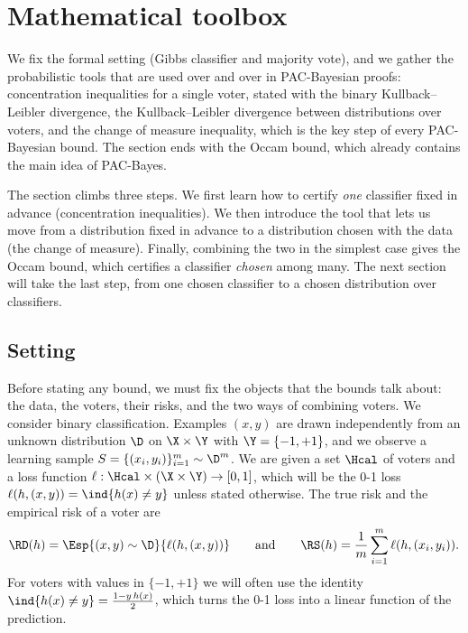 \section{Mathematical toolbox}
\label{chap:tools}

\begin{objectives}
We fix the formal setting (Gibbs classifier and majority vote), and we gather
the probabilistic tools that are used over and over in PAC-Bayesian proofs:
concentration inequalities for a single voter, stated with the binary
Kullback--Leibler divergence, the Kullback--Leibler divergence between
distributions over voters, and the change of measure inequality, which is the
key step of every PAC-Bayesian bound. The section ends with the Occam bound,
which already contains the main idea of PAC-Bayes.
\end{objectives}

The section climbs three steps. We first learn how to certify \emph{one}
classifier fixed in advance (concentration inequalities). We then introduce the
tool that lets us move from a distribution fixed in advance to a distribution
chosen with the data (the change of measure). Finally, combining the two in the
simplest case gives the Occam bound, which certifies a classifier \emph{chosen}
among many. The next section will take the last step, from one chosen
classifier to a chosen distribution over classifiers.

\subsection{Setting}

Before stating any bound, we must fix the objects that the bounds talk about:
the data, the voters, their risks, and the two ways of combining voters.
We consider binary classification. Examples $(x,y)$ are drawn independently from
an unknown distribution $\D$ on $\X\times\Y$ with $\Y=\{-1,+1\}$, and we observe
a learning sample $S=\{(x_i,y_i)\}_{i=1}^m\sim\D^m$. We are given a set $\Hcal$ of
voters and a loss function $\ell:\Hcal\times(\X\times\Y)\to[0,1]$, which will be
the 0-1 loss $\ell(h,(x,y))=\ind{h(x)\neq y}$ unless stated otherwise. The true
risk and the empirical risk of a voter are
\[
  \RD(h)=\Esp{(x,y)\sim\D}{\ell(h,(x,y))}\qquad\text{and}\qquad
  \RS(h)=\frac1m\sum_{i=1}^m\ell(h,(x_i,y_i)).
\]
For voters with values in $\{-1,+1\}$ we will often use the identity
$\ind{h(x)\neq y}=\frac{1-y\,h(x)}{2}$, which turns the 0-1 loss into a linear
function of the prediction.

